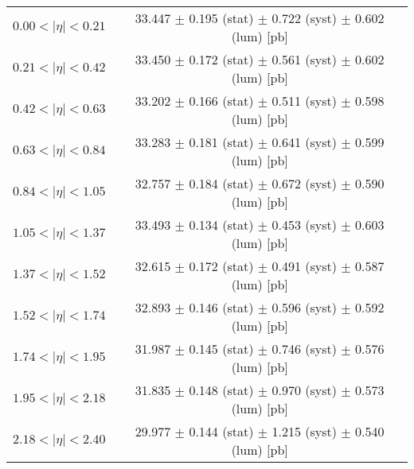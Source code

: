 \begin{tabular}{lc}
\hline
$0.00 < |\eta| <0.21$          & 33.447 $\pm$ 0.195 (stat) $\pm$ 0.722 (syst) $\pm$ 0.602 (lum) [pb]  \\
$0.21 < |\eta| <0.42$          & 33.450 $\pm$ 0.172 (stat) $\pm$ 0.561 (syst) $\pm$ 0.602 (lum) [pb]  \\
$0.42 < |\eta| <0.63$          & 33.202 $\pm$ 0.166 (stat) $\pm$ 0.511 (syst) $\pm$ 0.598 (lum) [pb]  \\
$0.63 < |\eta| <0.84$          & 33.283 $\pm$ 0.181 (stat) $\pm$ 0.641 (syst) $\pm$ 0.599 (lum) [pb]  \\
$0.84 < |\eta| <1.05$          & 32.757 $\pm$ 0.184 (stat) $\pm$ 0.672 (syst) $\pm$ 0.590 (lum) [pb]  \\
$1.05 < |\eta| <1.37$          & 33.493 $\pm$ 0.134 (stat) $\pm$ 0.453 (syst) $\pm$ 0.603 (lum) [pb]  \\
$1.37 < |\eta| <1.52$          & 32.615 $\pm$ 0.172 (stat) $\pm$ 0.491 (syst) $\pm$ 0.587 (lum) [pb]  \\
$1.52 < |\eta| <1.74$          & 32.893 $\pm$ 0.146 (stat) $\pm$ 0.596 (syst) $\pm$ 0.592 (lum) [pb]  \\
$1.74 < |\eta| <1.95$          & 31.987 $\pm$ 0.145 (stat) $\pm$ 0.746 (syst) $\pm$ 0.576 (lum) [pb]  \\
$1.95 < |\eta| <2.18$          & 31.835 $\pm$ 0.148 (stat) $\pm$ 0.970 (syst) $\pm$ 0.573 (lum) [pb]  \\
$2.18 < |\eta| <2.40$          & 29.977 $\pm$ 0.144 (stat) $\pm$ 1.215 (syst) $\pm$ 0.540 (lum) [pb]  \\
\hline
\end{tabular}

